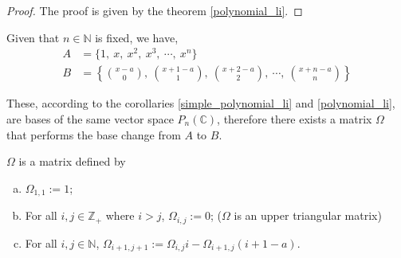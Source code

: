 \documentclass[12pt]{article}
\begin{document}
\begin{proof}
    The proof is given by the theorem \ref{polynomial_li}.
\end{proof}

\vspace{20px}

Given that $n \in \mathbb{N}$ is fixed, we have,
\begin{align*}
    A & = \{ 1,\ x,\ x^2,\ x^3,\ \cdots,\ x^n \}                                                             \\
    B & = \left\{ \binom{x-a}{0},\ \binom{x+1-a}{1},\ \binom{x+2-a}{2},\ \cdots ,\ \binom{x+n-a}{n} \right\}
\end{align*}

These, according to the corollaries \ref{simple_polynomial_li} and \ref{polynomial_li}, are bases of the same vector space $P_n(\mathbb{C})$, therefore there exists a matrix $\Omega$ that performs the base change from $A$ to $B$.

\vspace{20px}

\begin{theorem}

    $\Omega$ is a matrix defined by

    \begin{enumerate}[(a)]
        \item $\Omega_{1, 1} := 1$;
        \item For all $i, j \in \mathbb{Z_+}$ where  $i > j$, $\Omega_{i, j} := 0$; \hfill ($\Omega$ is an upper triangular matrix)
        \item For all $i, j \in \mathbb{N}$, $\Omega_{i+1, j+1} :=  \Omega_{i, j} i - \Omega_{i+1, j} (i+1-a)$.
    \end{enumerate}

\end{theorem}
\end{document}
